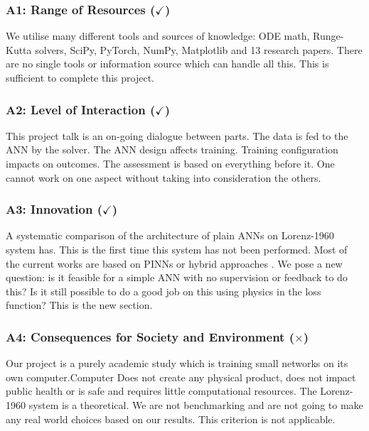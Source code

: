 \subsubsection{A1: Range of Resources ($\checkmark$)}

We utilise many different tools and sources of knowledge: ODE math, Runge-Kutta solvers, SciPy, PyTorch, NumPy, Matplotlib and 13 research papers. There are no single tools or information source which can handle all this. This is sufficient to complete this project.



\subsubsection{A2: Level of Interaction ($\checkmark$)}

This project talk is an on-going dialogue between parts. The data is fed to the ANN by the solver. The ANN design affects training. Training configuration impacts on outcomes. The assessment is based on
everything before it. One cannot work on one aspect without taking into consideration the others.


\subsubsection{A3: Innovation ($\checkmark$)}
A systematic comparison of the architecture of plain ANNs on Lorenz-1960 system has.
This is the first time this system has not been performed. Most of the current works are based on PINNs or
hybrid approaches \cite{matthews2024pinnde}. We pose a new question: is it feasible for a simple ANN with no supervision or feedback to do this?
Is it still possible to do a good job on this using physics in the loss function? This is the new section.



\subsubsection{A4: Consequences for Society and Environment ($\times$)}

Our project is a purely academic study which is training small networks on its own computer.Computer Does not create any physical product, does not impact public health or is
safe and requires little computational resources. The Lorenz-1960 system is a theoretical.
We are not benchmarking and are not going to make any real world choices based on our results. This criterion is not applicable.



